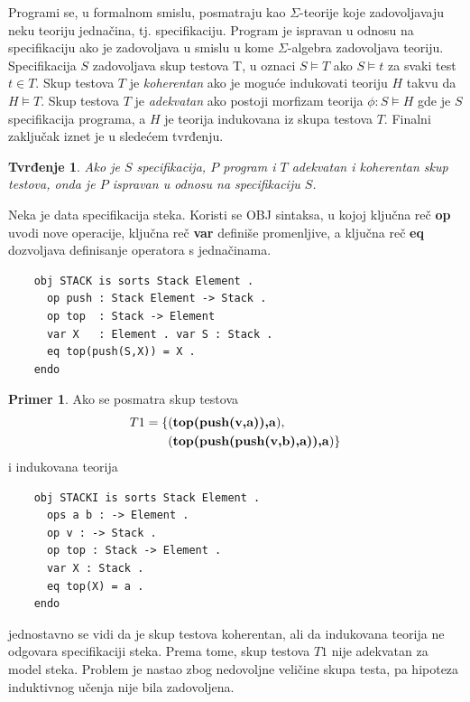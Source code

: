 \documentclass[a4paper]{article}
\newtheorem*{tvrdjenje}{Tvrđenje}
\theoremstyle{definition}
\newtheorem{primer}{Primer}[section]
\begin{document}
{\par Programi se, u formalnom smislu, posmatraju kao $\Sigma$-teorije koje zadovoljavaju neku teoriju jednačina, tj. specifikaciju. Program je ispravan u odnosu na specifikaciju ako je zadovoljava u smislu u kome $\Sigma$-algebra zadovoljava teoriju. Specifikacija $S$ zadovoljava skup testova T, u oznaci $S\models T$ ako $S\models t$ za svaki test $t\in T$. Skup testova $T$ je \emph{koherentan} ako je moguće indukovati teoriju $H$ takvu da $H\models T$. Skup testova $T$ je \emph{adekvatan} ako postoji morfizam teorija $\phi:S\models H$ gde je $S$ specifikacija programa, a $H$ je teorija indukovana iz skupa testova $T$. Finalni zaključak iznet je u sledećem tvrđenju.

\begin{tvrdjenje}
Ako je $S$ specifikacija, $P$ program i $T$ adekvatan i koherentan skup testova, onda je $P$ ispravan u odnosu na specifikaciju $S$.
\end{tvrdjenje}

Neka je data specifikacija steka. Koristi se OBJ sintaksa, u kojoj ključna reč \textbf{op} uvodi nove operacije, ključna reč \textbf{var} definiše promenljive, a ključna reč \textbf{eq} dozvoljava definisanje operatora s jednačinama.

\begin{verbatim}
	obj STACK is sorts Stack Element .
	  op push : Stack Element -> Stack .
	  op top  : Stack -> Element
	  var X   : Element . var S : Stack .
	  eq top(push(S,X)) = X .
	endo
\end{verbatim}

\begin{primer}
Ako se posmatra skup testova
\begin{eqnarray*}T1 = \{&(\mbox{\textbf{top(push(v,a)),a}}),\\
&(\mbox{\textbf{top(push(push(v,b),a)),a}})\}
\end{eqnarray*}
i indukovana teorija
\begin{verbatim}
	obj STACKI is sorts Stack Element .
	  ops a b : -> Element .
	  op v : -> Stack .
	  op top : Stack -> Element .
	  var X : Stack .
	  eq top(X) = a .
	endo	
\end{verbatim}
jednostavno se vidi da je skup testova koherentan, ali da indukovana teorija ne odgovara specifikaciji steka. Prema tome, skup testova $T1$ nije adekvatan za model steka. Problem je nastao zbog nedovoljne veličine skupa testa, pa hipoteza induktivnog učenja nije bila zadovoljena.
\end{primer}

}
\end{document}
